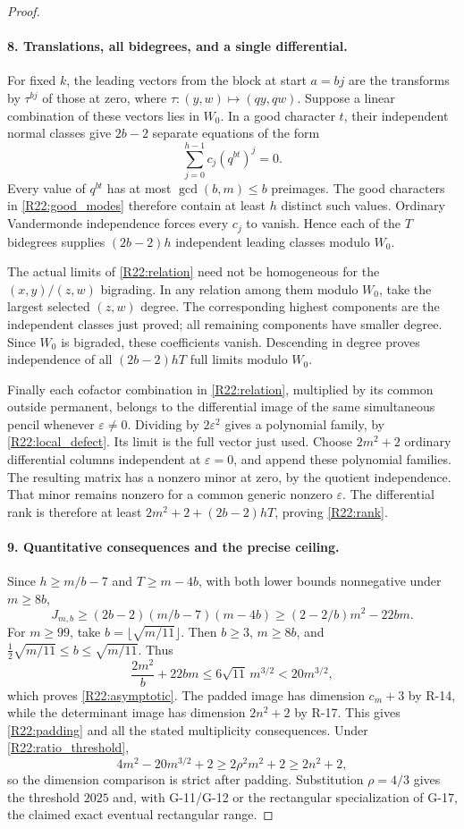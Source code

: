 \documentclass[11pt,a4paper]{article}
\theoremstyle{definition}\newtheorem{definition}{Definition}
\begin{document}
\begin{proof}
\paragraph{8. Translations, all bidegrees, and a single differential.}
For fixed $k$, the leading vectors from the block at start $a=bj$
are the transforms by $\tau^{bj}$ of those at zero, where
$\tau:(y,w)\mapsto(qy,qw)$. Suppose a linear combination of these
vectors lies in $W_0$. In a good character $t$, their independent
normal classes give $2b-2$ separate equations of the form
\[
 \sum_{j=0}^{h-1}c_j(q^{bt})^j=0.
\]
Every value of $q^{bt}$ has at most $\gcd(b,m)\leq b$ preimages.
The good characters in \eqref{R22:good_modes} therefore contain
at least $h$ distinct such values. Ordinary Vandermonde independence
forces every $c_j$ to vanish. Hence each of the $T$ bidegrees supplies
$(2b-2)h$ independent leading classes modulo $W_0$.

The actual limits of \eqref{R22:relation} need not be homogeneous
for the $(x,y)/(z,w)$ bigrading. In any relation among them modulo
$W_0$, take the largest selected $(z,w)$ degree. The corresponding
highest components are the independent classes just proved; all
remaining components have smaller degree. Since $W_0$ is bigraded,
these coefficients vanish. Descending in degree proves independence
of all $(2b-2)hT$ full limits modulo $W_0$.

Finally each cofactor combination in \eqref{R22:relation}, multiplied
by its common outside permanent, belongs to the differential image
of the same simultaneous pencil whenever $\varepsilon\ne0$.
Dividing by $2\varepsilon^2$ gives a polynomial family, by
\eqref{R22:local_defect}. Its limit is the full vector just used.
Choose $2m^2+2$ ordinary differential columns independent at
$\varepsilon=0$, and append these polynomial families. The resulting
matrix has a nonzero minor at zero, by the quotient independence.
That minor remains nonzero for a common generic nonzero
$\varepsilon$. The differential rank is therefore at least
$2m^2+2+(2b-2)hT$, proving \eqref{R22:rank}.

\paragraph{9. Quantitative consequences and the precise ceiling.}
Since $h\geq m/b-7$ and $T\geq m-4b$, with both lower bounds
nonnegative under $m\geq8b$,
\[
 J_{m,b}\geq(2b-2)(m/b-7)(m-4b)
 \geq(2-2/b)m^2-22bm.
\]
For $m\geq99$, take $b=\lfloor\sqrt{m/11}\rfloor$.
Then $b\geq3$, $m\geq8b$, and
$\frac12\sqrt{m/11}\leq b\leq\sqrt{m/11}$. Thus
\[
 \frac{2m^2}{b}+22bm\leq6\sqrt{11}\,m^{3/2}
 <20m^{3/2},
\]
which proves \eqref{R22:asymptotic}. The padded image has dimension
$c_m+3$ by R-14, while the determinant image has dimension
$2n^2+2$ by R-17. This gives \eqref{R22:padding} and all the stated
multiplicity consequences. Under \eqref{R22:ratio_threshold},
\[
 4m^2-20m^{3/2}+2\geq2\rho^2m^2+2\geq2n^2+2,
\]
so the dimension comparison is strict after padding. Substitution
$\rho=4/3$ gives the threshold $2025$ and, with G-11/G-12 or the
rectangular specialization of G-17, the claimed exact eventual
rectangular range.


\end{proof}
\end{document}
